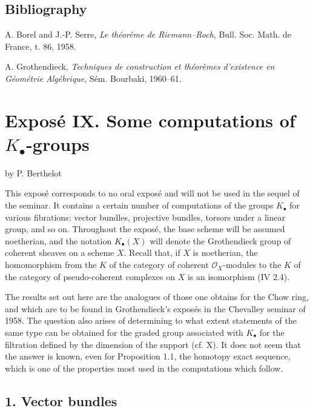\subsection*{Bibliography}
\begin{enumerate}[label={[\arabic*]}]
\item A. Borel and J.-P. Serre, \emph{Le théorème de Riemann--Roch}, Bull. Soc. Math. de France, t. 86, 1958.
\item A. Grothendieck, \emph{Techniques de construction et théorèmes d'existence en Géométrie Algébrique}, Sém. Bourbaki, 1960--61.
\end{enumerate}



\section*{Exposé IX. Some computations of $K_\bullet$-groups}
\begin{center}
by P. Berthelot
\end{center}

This exposé corresponds to no oral exposé and will not be used in the sequel of the seminar. It contains a certain number of computations of the groups $K_\bullet$ for various fibrations: vector bundles, projective bundles, torsors under a linear group, and so on. Throughout the exposé, the base scheme will be assumed noetherian, and the notation $K_\bullet(X)$ will denote the Grothendieck group of coherent sheaves on a scheme $X$. Recall that, if $X$ is noetherian, the homomorphism from the $K$ of the category of coherent $\mathcal O_X$-modules to the $K$ of the category of pseudo-coherent complexes on $X$ is an isomorphism (IV 2.4).

The results set out here are the analogues of those one obtains for the Chow ring, and which are to be found in Grothendieck's exposés in the Chevalley seminar of 1958. The question also arises of determining to what extent statements of the same type can be obtained for the graded group associated with $K_\bullet$ for the filtration defined by the dimension of the support (cf. X). It does not seem that the answer is known, even for Proposition 1.1, the homotopy exact sequence, which is one of the properties most used in the computations which follow.

\subsection*{1. Vector bundles}

